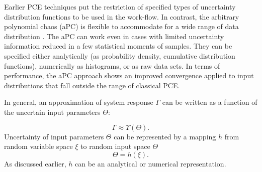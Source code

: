 Earlier PCE techniques put the restriction of specified types of uncertainty
distribution functions to be used in the work-flow. In contrast, the arbitrary polynomial chaos (aPC) is flexible to accommodate for a wide range of data
distribution \cite{oladyshkin2011concept}. The aPC can work even in cases with
limited uncertainty information reduced in a few statistical moments of samples.
They can be specified either analytically (as probability density, cumulative
distribution functions), numerically as histograms, or as raw data sets. In
terms of performance, the aPC approach shows an improved convergence applied to
input distributions that fall outside the range of classical PCE.

In general, an approximation of system response $\Gamma$ can be written as a
function of the uncertain input parameters $\Theta$:

\begin{equation}
  \Gamma\approx\Upsilon(\Theta).
  \label{eq:1}
\end{equation} 
%
Uncertainty of input parameters $\Theta$ can be represented by a mapping $h$ from
random variable space $\xi$ to random input space $\Theta$%
\begin{equation}
  \Theta=h(\xi).
  \label{eq:rand}
\end{equation} As discussed earlier, $h$ can be an analytical or numerical
representation.



